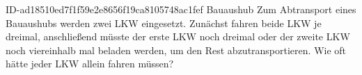 \begin{exercise}
      {ID-ad18510ed7f1f59e2e8656f19ca8105748ac1fef}
      {Bauaushub}
  \ifproblem\problem
    Zum Abtransport eines Bauaushubs werden zwei LKW eingesetzt. Zunächst fahren
    beide LKW je dreimal, anschließend müsste der erste LKW noch dreimal oder der
    zweite LKW noch viereinhalb mal beladen werden, um den Rest abzutransportieren.
    Wie oft hätte jeder LKW allein fahren müssen?
  \fi
\end{exercise}
